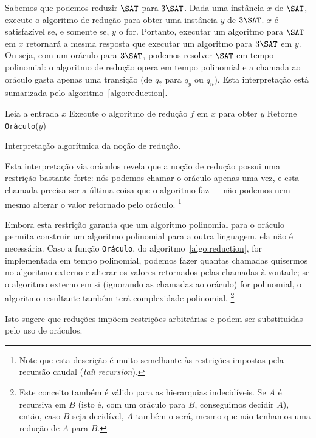 Sabemos que podemos reduzir $\SAT$ para $3\SAT$.
Dada uma instância $x$ de $\SAT$,
execute o algoritmo de redução para obter uma instância $y$ de $3\SAT$.
$x$ é satisfazível se, e somente se, $y$ o for.
Portanto, executar um algoritmo para $\SAT$ em $x$
retornará a mesma resposta
que executar um algoritmo para $3\SAT$ em $y$.
Ou seja, com um oráculo para $3\SAT$,
podemos resolver $\SAT$ em tempo polinomial:
o algoritmo de redução opera em tempo polinomial
e a chamada ao oráculo gasta apenas uma transição
(de $q_?$ para $q_y$ ou $q_n$).
Esta interpretação está sumarizada pelo algoritmo~\ref{algo:reduction}.

\begin{algorithm}[h]
    Leia a entrada $x$\;
    Execute o algoritmo de redução $f$ em $x$ para obter $y$\;
    Retorne \texttt{Oráculo}($y$)\;
    \caption{
        Interpretação algorítmica da noção de redução.
    }
    \label{algo:reduction}
\end{algorithm}

Esta interpretação via oráculos revela que
a noção de redução possui uma restrição bastante forte:
nós podemos chamar o oráculo apenas uma vez,
e esta chamada precisa ser a última coisa que o algoritmo faz
--- não podemos nem mesmo alterar o valor retornado pelo oráculo.%
\footnote{
    Note que esta descrição é muito semelhante
    às restrições impostas pela recursão caudal
    (\emph{tail recursion}).
}

Embora esta restrição garanta que
um algoritmo polinomial para o oráculo
permita construir um algoritmo polinomial para a outra linguagem,
ela não é necessária.
Caso a função \texttt{Oráculo}, do algoritmo~\ref{algo:reduction},
for implementada em tempo polinomial,
podemos fazer quantas chamadas quisermos no algoritmo externo
e alterar os valores retornados pelas chamadas à vontade;
se o algoritmo externo em si
(ignorando as chamadas ao oráculo)
for polinomial,
o algoritmo resultante também terá complexidade polinomial.%
\footnote{
    Este conceito também é válido para as hierarquias indecidíveis.
    Se $A$ é recursiva em $B$
    (isto é, com um oráculo para $B$, conseguimos decidir $A$),
    então, caso $B$ seja decidível,
    $A$ também o será,
    mesmo que não tenhamos uma redução de $A$ para $B$.
}

Isto sugere que reduções impõem restrições arbitrárias
e podem ser substituídas pelo uso de oráculos.
